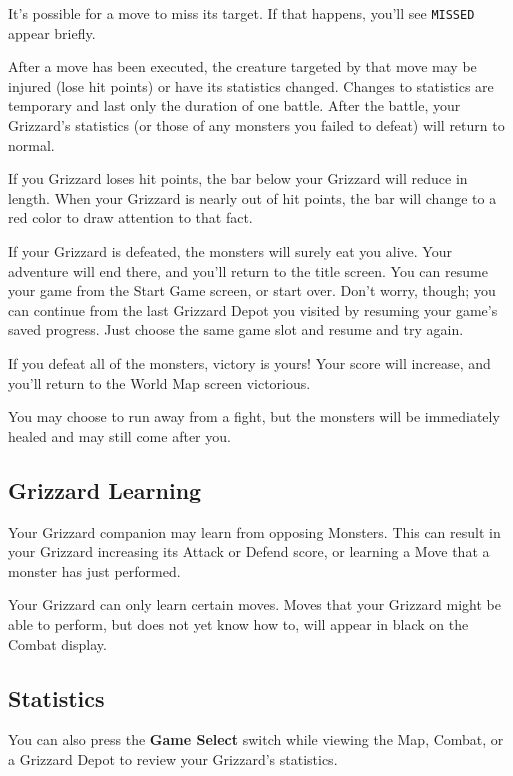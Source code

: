 \documentclass[10pt,twocolumn,openany,article]{memoir}
\begin{document}
It's possible for a move to miss its target. If that happens, you'll see
\texttt{MISSED} appear briefly.

After a move  has been executed, the creature targeted  by that move may
be injured (lose hit points) or  have its statistics changed. Changes to
statistics  are temporary  and last  only  the duration  of one  battle.
After the battle,  your Grizzard's statistics (or those  of any monsters
you failed to defeat) will return to normal.

If  you Grizzard  loses hit  points, the  bar below  your Grizzard  will
reduce in  length. When your Grizzard  is nearly out of  hit points, the
bar will change to a red color to draw attention to that fact.

If your  Grizzard is defeated, the  monsters will surely eat  you alive.
Your adventure will end there, and you'll return to the title screen.
\ifdefined\NOSAVE
You can  resume your  game from  the Start Game  screen, or  start over.
\else
Don't worry, though;  you can continue from the last  Grizzard Depot you
visited by  resuming your  game's saved progress.  Just choose  the same
game slot and resume and try again.
\fi

If you  defeat all of  the monsters, victory  is yours! Your  score will
increase, and you'll return to the World Map screen victorious.

You  may choose  to run  away from  a fight,  but the  monsters will  be
immediately healed and may still come after you.

\subsection{Grizzard Learning}

Your  Grizzard companion  may  learn from  opposing  Monsters. This  can
result  in your  Grizzard  increasing  its Attack  or  Defend score,  or
learning a Move that a monster has just performed.

Your Grizzard  can only  learn certain moves.  Moves that  your Grizzard
might be able to  perform, but does not yet know how  to, will appear in
black on the Combat display.

\subsection{Statistics}

You can  also press  the \textbf{Game Select}  switch while  viewing the
Map, Combat, or a Grizzard Depot to review your Grizzard's statistics.
\end{document}
